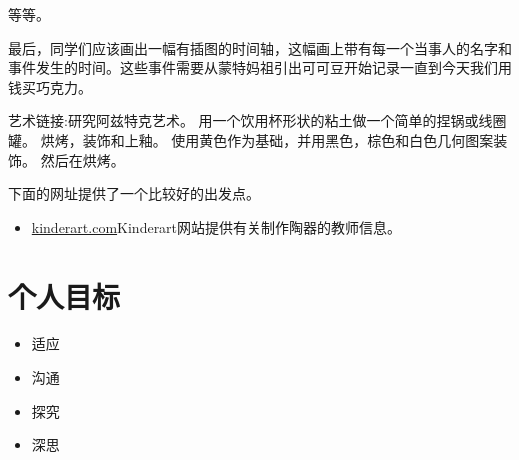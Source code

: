      等等。\par
     最后，同学们应该画出一幅有插图的时间轴，这幅画上带有每一个当事人的名字和事件发生的时间。这些事件需要从蒙特妈祖引出可可豆开始记录一直到今天我们用钱买巧克力。\par
     艺术链接:研究阿兹特克艺术。 用一个饮用杯形状的粘土做一个简单的捏锅或线圈罐。 烘烤，装饰和上釉。 使用黄色作为基础，并用黑色，棕色和白色几何图案装饰。 然后在烘烤。\par
     下面的网址提供了一个比较好的出发点。\par
     \begin{itemize}
       \item \href{kinderart.com/sculpture/clay.shtml }{kinderart.com}Kinderart网站提供有关制作陶器的教师信息。
     \end{itemize}  




\section{个人目标}
   \begin{itemize}
     \item 适应
     \item 沟通
     \item 探究
     \item 深思
   \end{itemize}   
